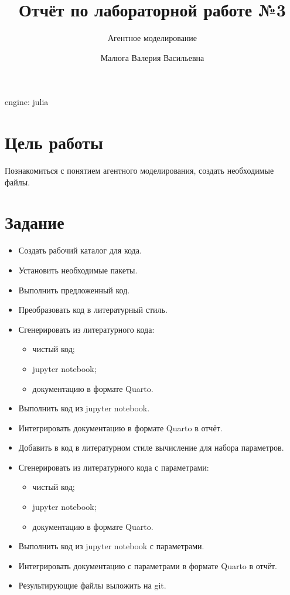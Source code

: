 \documentclass[
  english,
  russian,
  12pt,
  a4paper,
  DIV=11,
  numbers=noendperiod]{scrreprt}
\title{Отчёт по лабораторной работе №3}
\subtitle{Агентное моделирование}
\author{Малюга Валерия Васильевна}
\date{}
\providecommand{\tightlist}{%
  \setlength{\itemsep}{0pt}\setlength{\parskip}{0pt}}
\renewcommand*\contentsname{Содержание}
\newcommand\contentsname{Содержание}
\begin{document}
\maketitle

\renewcommand*\contentsname{Содержание}
{
\setcounter{tocdepth}{1}
\tableofcontents
}
\listoffigures
\listoftables

engine: julia

\chapter{Цель
работы}\label{ux446ux435ux43bux44c-ux440ux430ux431ux43eux442ux44b}

Познакомиться с понятием агентного моделирования, создать необходимые
файлы.

\chapter{Задание}\label{ux437ux430ux434ux430ux43dux438ux435}

\begin{itemize}
\tightlist
\item
  Создать рабочий каталог для кода.
\item
  Установить необходимые пакеты.
\item
  Выполнить предложенный код.
\item
  Преобразовать код в литературный стиль.
\item
  Сгенерировать из литературного кода:

  \begin{itemize}
  \tightlist
  \item
    чистый код;
  \item
    jupyter notebook;
  \item
    документацию в формате Quarto.
  \end{itemize}
\item
  Выполнить код из jupyter notebook.
\item
  Интегрировать документацию в формате Quarto в отчёт.
\item
  Добавить в код в литературном стиле вычисление для набора параметров.
\item
  Сгенерировать из литературного кода с параметрами:

  \begin{itemize}
  \tightlist
  \item
    чистый код;
  \item
    jupyter notebook;
  \item
    документацию в формате Quarto.
  \end{itemize}
\item
  Выполнить код из jupyter notebook с параметрами.
\item
  Интегрировать документацию с параметрами в формате Quarto в отчёт.
\item
  Результирующие файлы выложить на git.
\end{itemize}
\end{document}
